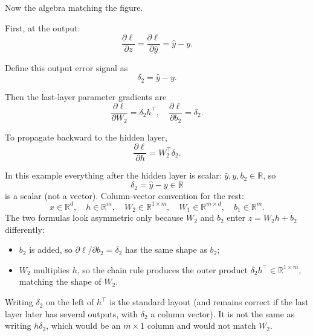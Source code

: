\documentclass[11pt,a4paper]{article}
\theoremstyle{definition}
\begin{document}
\begin{example}
\begin{center}
\end{center}

Now the algebra matching the figure.

First, at the output:
\[ \frac{\partial \ell}{\partial z} = \frac{\partial \ell}{\partial \hat{y}} = \hat{y} - y. \]

Define this output error signal as
\[
\delta_2 = \hat{y} - y.
\]

Then the last-layer parameter gradients are
\[
\frac{\partial \ell}{\partial W_2} = \delta_2 h^\top, \quad \frac{\partial \ell}{\partial b_2} = \delta_2.
\]

To propagate backward to the hidden layer,
\[
\frac{\partial \ell}{\partial h} = W_2^\top \delta_2.
\]

\begin{remark}
In this example everything after the hidden layer is scalar: $\hat{y},y,b_2\in\mathbb{R}$, so
\[
\delta_2=\hat{y}-y\in\mathbb{R}
\]
is a scalar (not a vector). Column-vector convention for the rest:
\[
x\in\mathbb{R}^d,\quad
h\in\mathbb{R}^m,\quad
W_2\in\mathbb{R}^{1\times m},\quad
W_1\in\mathbb{R}^{m\times d},\quad
b_1\in\mathbb{R}^m.
\]
The two formulas look asymmetric only because $W_2$ and $b_2$ enter $z=W_2h+b_2$ differently:
\begin{itemize}
  \item $b_2$ is added, so $\partial\ell/\partial b_2=\delta_2$ has the same shape as $b_2$;
  \item $W_2$ multiplies $h$, so the chain rule produces the outer product
  $\delta_2 h^\top\in\mathbb{R}^{1\times m}$, matching the shape of $W_2$.
\end{itemize}
Writing $\delta_2$ on the left of $h^\top$ is the standard layout (and remains correct if the last layer later has several outputs, with $\delta_2$ a column vector). It is not the same as writing $h\delta_2$, which would be an $m\times 1$ column and would not match $W_2$.
\end{remark}


\end{example}
\end{document}
